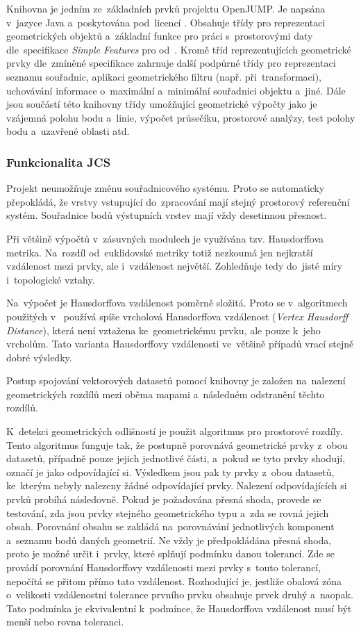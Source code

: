 Knihovna  je jedním ze~základních prvků projektu OpenJUMP.
Je napsána v~jazyce Java a~poskytována pod~licencí . Obsahuje třídy 
pro reprezentaci geometrických objektů a~základní funkce pro práci 
s~prostorovými daty dle~specifikace \textit{Simple Features} pro  
od~. Kromě tříd reprezentujících geometrické prvky dle~zmíněné
specifikace zahrnuje další podpůrné třídy pro reprezentaci seznamu souřadnic,
aplikaci geometrického filtru (např. při~transformaci), uchovávání informace
o~maximální a~minimální souřadnici objektu a~jiné. Dále jsou součástí této 
knihovny třídy umožňující geometrické výpočty jako je vzájemná polohu bodu 
a~linie, výpočet průsečíku, prostorové analýzy, test polohy bodu a~uzavřené
oblasti atd. 

\subsubsection{Funkcionalita JCS}
\label{jcs-funkcionalita}

Projekt  neumožňuje změnu souřadnicového systému. Proto se
automaticky přepokládá, že vrstvy vstupující do~zpracování mají stejný
prostorový referenční systém. Souřadnice bodů výstupních vrstev mají vždy
desetinnou přesnost.

Při většině výpočtů v~zásuvných modulech  je využívána tzv. 
Hausdorffova metrika. Na~rozdíl od~euklidovské metriky totiž nezkoumá jen
nejkratší vzdálenost mezi prvky, ale i~vzdálenost největší.
Zohledňuje tedy do~jisté míry i~topologické vztahy.

Na~výpočet je Hausdorffova vzdálenost poměrně složitá. Proto se v~algoritmech
použitých v~ používá spíše vrcholová Hausdorffova vzdálenost 
(\textit{Vertex Hausdorff Distance}), která není vztažena ke~geometrickému 
prvku, ale pouze k~jeho vrcholům. Tato varianta Hausdorffovy vzdálenosti 
ve~většině případů vrací stejně dobré výsledky.

Postup spojování vektorových datasetů pomocí knihovny  je založen
na~na\-le\-zení geometrických rozdílů mezi oběma mapami a~následném odstranění 
těchto rozdílů.

K~detekci geometrických odlišností je použit algoritmus pro prostorové rozdíly.
Tento algoritmus funguje tak, že postupně porovnává geometrické prvky z~obou 
datasetů, případně pouze jejich jednotlivé části, a~pokud se tyto prvky shodují,
ozna\-čí je jako odpovídající si. Výsledkem jsou pak ty prvky z~obou datasetů, 
ke~kterým nebyly nalezeny žádné odpovídající prvky. Nalezení odpovídajících si
prvků probíhá následovně. Pokud je požadována přesná shoda, provede se 
testování, zda jsou prvky stejného geometrického typu a~zda se rovná jejich 
obsah. Porovnání obsahu se za\-kládá na~porovnávání jednotlivých komponent 
a~seznamu bodů daných geometrií. Ne vždy je předpokládána přesná shoda,
proto je možné určit i~prvky, které splňují podmínku danou tolerancí. Zde se
provádí porovnání Hausdorffovy vzdálenosti mezi prvky s~touto tolerancí, 
nepočítá se přitom přímo tato vzdálenost. Rozhodující je, jestliže obalová 
zóna o~velikosti vzdálenostní tolerance prvního prvku obsahuje prvek druhý 
a~naopak. Tato podmínka je ekvivalentní k~podmínce, že Hausdorffova vzdálenost
musí být menší nebo rovna toleranci. 

